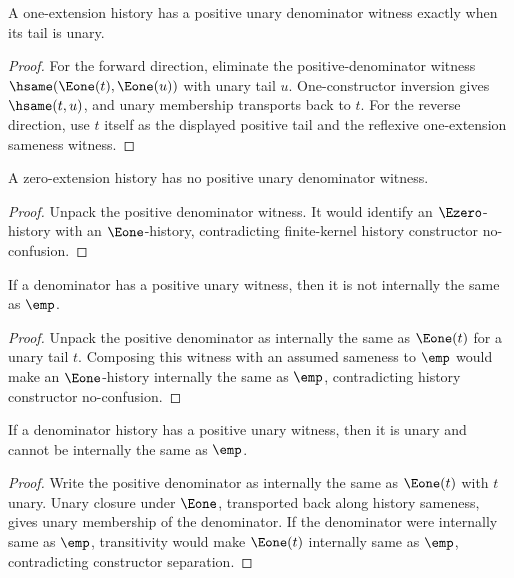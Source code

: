 \begin{theorem}
\label{thm:rat-positive-unary-denominator-eone-iff-unary}
A one-extension history has a positive unary denominator witness exactly when
its tail is unary.
\end{theorem}
\begin{proof}
For the forward direction, eliminate the positive-denominator witness
\(\hsame(\Eone(t),\Eone(u))\) with unary tail \(u\). One-constructor inversion
gives \(\hsame(t,u)\), and unary membership transports back to \(t\). For the
reverse direction, use \(t\) itself as the displayed positive tail and the
reflexive one-extension sameness witness.
\end{proof}

\begin{theorem}
\label{thm:rat-positive-denominator-e0-absurd}
A zero-extension history has no positive unary denominator witness.
\end{theorem}
\begin{proof}
Unpack the positive denominator witness. It would identify an
\(\Ezero\)-history with an \(\Eone\)-history, contradicting finite-kernel
history constructor no-confusion.
\end{proof}

\begin{theorem}
\label{thm:rat-positive-unary-denominator-not-empty}
If a denominator has a positive unary witness, then it is not internally the
same as \(\emp\).
\end{theorem}
\begin{proof}
Unpack the positive denominator as internally the same as \(\Eone(t)\) for a
unary tail \(t\). Composing this witness with an assumed sameness to \(\emp\)
would make an \(\Eone\)-history internally the same as \(\emp\), contradicting
history constructor no-confusion.
\end{proof}

\begin{theorem}
\label{thm:positive-unary-denominator-unary-and-nonempty}
If a denominator history has a positive unary witness, then it is unary and cannot be internally the same as \(\emp\).
\end{theorem}
\begin{proof}
Write the positive denominator as internally the same as \(\Eone(t)\) with \(t\) unary. Unary closure under \(\Eone\), transported back along history sameness, gives unary membership of the denominator. If the denominator were internally same as \(\emp\), transitivity would make \(\Eone(t)\) internally same as \(\emp\), contradicting constructor separation.
\end{proof}

